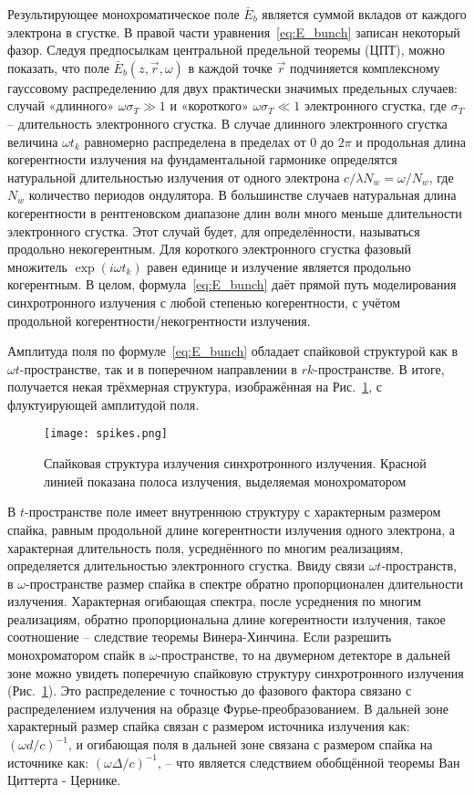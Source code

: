 Результирующее монохроматическое поле $\bar{E}_{b}$ является суммой вкладов от каждого электрона в сгустке. В правой части уравнения~\ref{eq:E_bunch} записан некоторый фазор. Следуя предпосылкам центральной предельной теоремы (ЦПТ), можно показать, что поле $\bar{E}_{b}(z, \vec{r}, \omega)$ в каждой точке $\vec{r}$ подчиняется комплексному гауссовому распределению для двух практически значимых предельных случаев: случай «длинного» $\omega\sigma_T \gg 1$ и «короткого»  $\omega\sigma_T \ll 1$ электронного сгустка, где $\sigma_T$ -- длительность электронного сгустка. В случае длинного электронного сгустка величина $\omega t_k$ равномерно распределена в пределах от $0$ до $2\pi$ и продольная длина когерентности излучения на фундаментальной гармонике определятся натуральной длительностью излучения от одного электрона $c/\lambda N_w = \omega / N_w$, где $N_w$ количество периодов ондулятора. В большинстве случаев натуральная длина когерентности в рентгеновском диапазоне длин волн много меньше длительности электронного сгустка. Этот случай будет, для определённости, называться продольно некогерентным. Для короткого электронного сгустка фазовый множитель $\exp{(i \omega t_k)}$ равен единице и излучение является продольно когерентным. В целом, формула~\ref{eq:E_bunch} даёт прямой путь моделирования синхротронного излучения с любой степенью когерентности, с учётом продольной когерентности/некогрентности излучения.

Амплитуда поля по формуле~\ref{eq:E_bunch} обладает спайковой структурой как в $\omega t$-пространстве, так и в поперечном направлении в $rk$-пространстве. В итоге, получается некая трёхмерная структура, изображённая на Рис.~\ref{fig:spikes}, с флуктуирующей амплитудой поля. 
\begin{figure}[H]
	\centering 	\texttt{[image: spikes.png]}
	\caption{Спайковая структура излучения синхротронного излучения. Красной линией показана полоса излучения, выделяемая монохроматором}
	\label{fig:spikes}
\end{figure}
\noindent В $t$-пространстве поле имеет внутреннюю структуру с характерным размером спайка, равным продольной длине когерентности излучения одного электрона, а характерная длительность поля, усреднённого по многим реализациям, определяется длительностью электронного сгустка. Ввиду связи $\omega t$-пространств, в $\omega$-пространстве размер спайка в спектре обратно пропорционален длительности излучения. Характерная огибающая спектра, после усреднения по многим реализациям, обратно пропорциональна длине когерентности излучения, такое соотношение -- следствие теоремы Винера-Хинчина. Если разрешить монохроматором спайк в $\omega$-пространстве, то на двумерном детекторе в дальней зоне можно увидеть поперечную спайковую структуру синхротронного излучения (Рис.~\ref{fig:spikes}). Это распределение с точностью до фазового фактора связано с распределением излучения на образце Фурье-преобразованием. В дальней зоне характерный размер спайка связан с размером источника излучения как:  $(\omega d /c)^{-1}$, и огибающая поля в дальней зоне связана с размером спайка на источнике как: $(\omega \Delta /c)^{-1}$, -- что является следствием обобщённой теоремы Ван Циттерта - Цернике. 


\newpage






